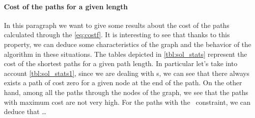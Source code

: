 \paragraph{Cost of the paths for a given length}
In this paragraph we want to give some results about the cost of the paths calculated through the \cref{eq:costf}. It is interesting to see that thanks to this property, we can deduce some characteristics of the graph and the behavior of the algorithm in these situations. The tables depicted in \cref{tbl:sol_stats} represent the cost of the shortest paths for a given path length. In particular let's take into account \cref{tbl:sol_stats1}, since we are dealing with \mdd s, we can see that there always exists a path of cost zero for a given node at the end of the path. On the other hand, among all the paths through the nodes of the graph, we see that the paths with maximum cost are not very high.
For the paths with the \alldiff\ constraint, we can deduce that \dots{}